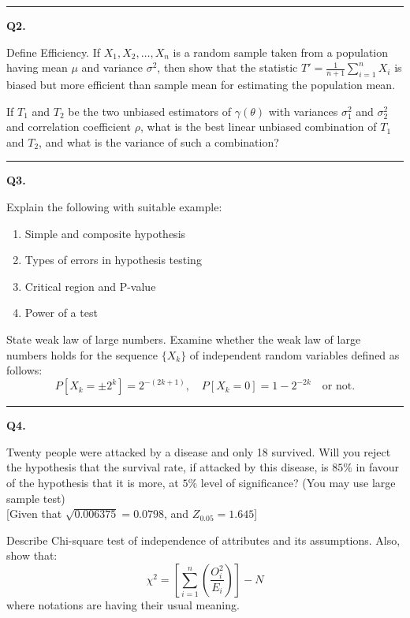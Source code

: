 \documentclass[11pt,a4paper]{article}
\begin{document}
\medskip\rule{\linewidth}{0.2pt}\medskip




\noindent   \textbf{Q2.}

\begin{parts}
  \item Define Efficiency. If $X_1, X_2, \dots, X_n$ is a random sample taken from a population having mean $\mu$ and variance $\sigma^2$, then show that the statistic $T' = \frac{1}{n+1}\sum_{i=1}^n X_i$ is biased but more efficient than sample mean for estimating the population mean.

  \item If $T_1$ and $T_2$ be the two unbiased estimators of $\gamma( \theta)$ with variances $\sigma_1^2$ and $\sigma_2^2$ and correlation coefficient $\rho$, what is the best linear unbiased combination of $T_1$ and $T_2$, and what is the variance of such a combination?
\end{parts}

\medskip\rule{\linewidth}{0.2pt}\medskip




\noindent   \textbf{Q3.}

\begin{parts}
  \item Explain the following with suitable example:
  
\begin{enumerate}[label=(\roman*)]
    \item Simple and composite hypothesis
    \item Types of errors in hypothesis testing
    \item Critical region and P-value
    \item Power of a test
  \end{enumerate}

  \item State weak law of large numbers. Examine whether the weak law of large numbers holds for the sequence $\{X_k\}$ of independent random variables defined as follows:
  \[ P[X_k = \pm 2^k] = 2^{-(2k+1)}, \quad P[X_k = 0] = 1 - 2^{-2k} \quad  \text{or not.} \]
\end{parts}

\medskip\rule{\linewidth}{0.2pt}\medskip




\noindent   \textbf{Q4.}

\begin{parts}
  \item Twenty people were attacked by a disease and only 18 survived. Will you reject the hypothesis that the survival rate, if attacked by this disease, is $85\%$ in favour of the hypothesis that it is more, at $5\%$ level of significance? (You may use large sample test) \\
  {[Given that $\sqrt{0.006375} = 0.0798$, and $Z_{0.05} = 1.645$]}

  \item Describe Chi-square test of independence of attributes and its assumptions. Also, show that:
  \[ \chi^2 = \left[ \sum_{i=1}^n \left(\frac{O_i^2}{E_i}\right) \right] - N \]
  where notations are having their usual meaning.
\end{parts}
\end{document}
